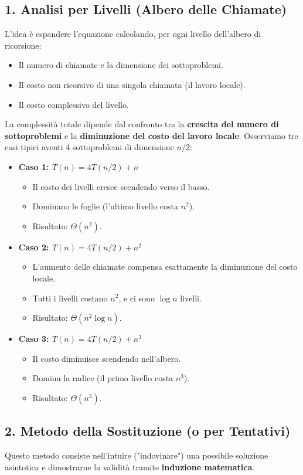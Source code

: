 \documentclass[12pt, a4paper]{article}
\begin{document}
\subsection{1. Analisi per Livelli (Albero delle Chiamate)}
L'idea è espandere l'equazione calcolando, per ogni livello dell'albero di ricorsione:
\begin{itemize}
\item Il numero di chiamate e la dimensione dei sottoproblemi.
\item Il costo non ricorsivo di una singola chiamata (il lavoro locale).
\item Il costo complessivo del livello.
\end{itemize}

La complessità totale dipende dal confronto tra la \textbf{crescita del numero di sottoproblemi} e la \textbf{diminuzione del costo del lavoro locale}. Osserviamo tre casi tipici aventi 4 sottoproblemi di dimensione $n/2$:

\begin{itemize}
\item \textbf{Caso 1: $T(n) = 4T(n/2) + n$}
\begin{itemize}
\item Il costo dei livelli cresce scendendo verso il basso.
\item Dominano le foglie (l'ultimo livello costa $n^2$).
\item Risultato: $\Theta(n^2)$.
\end{itemize}
\item \textbf{Caso 2: $T(n) = 4T(n/2) + n^2$}
\begin{itemize}
\item L'aumento delle chiamate compensa esattamente la diminuzione del costo locale.
\item Tutti i livelli costano $n^2$, e ci sono $\log n$ livelli.
\item Risultato: $\Theta(n^2 \log n)$.
\end{itemize}
\item \textbf{Caso 3: $T(n) = 4T(n/2) + n^3$}
\begin{itemize}
\item Il costo diminuisce scendendo nell'albero.
\item Domina la radice (il primo livello costa $n^3$).
\item Risultato: $\Theta(n^3)$.
\end{itemize}
\end{itemize}

\subsection{2. Metodo della Sostituzione (o per Tentativi)}
Questo metodo consiste nell'intuire ("indovinare") una possibile soluzione asintotica e dimostrarne la validità tramite \textbf{induzione matematica}.
\end{document}
